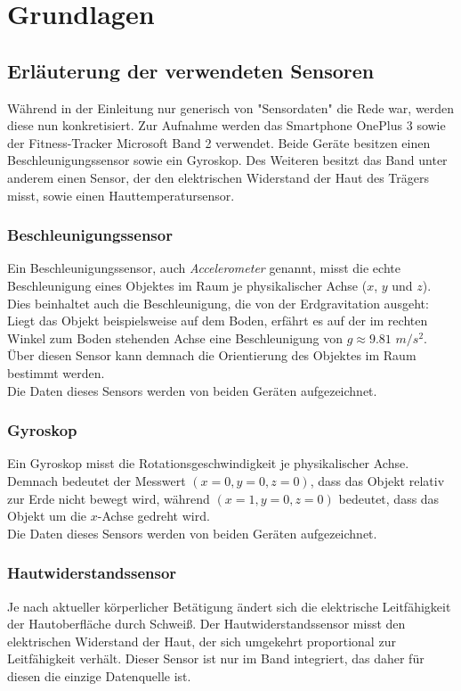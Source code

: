 \chapter{Grundlagen}
\label{chap:background}
\section{Erläuterung der verwendeten Sensoren}
Während in der Einleitung nur generisch von "Sensordaten" die Rede war, werden diese nun konkretisiert. Zur Aufnahme werden das Smartphone OnePlus 3 sowie der Fitness-Tracker Microsoft Band 2 verwendet. Beide Geräte besitzen einen Beschleunigungssensor sowie ein Gyroskop. Des Weiteren besitzt das Band unter anderem einen Sensor, der den elektrischen Widerstand der Haut des Trägers misst, sowie einen Hauttemperatursensor.

\subsection{Beschleunigungssensor}
Ein Beschleunigungssensor, auch \textit{Accelerometer} genannt, misst die echte Beschleunigung eines Objektes im Raum je physikalischer Achse ($x$, $y$ und $z$). Dies beinhaltet auch die Beschleunigung, die von der Erdgravitation ausgeht: Liegt das Objekt beispielsweise auf dem Boden, erfährt es auf der im rechten Winkel zum Boden stehenden Achse eine Beschleunigung von $g \approx 9.81$ $m/s^2$\cite{SensorsOverview}\cite{nistsi}. Über diesen Sensor kann demnach die Orientierung des Objektes im Raum bestimmt werden. \\
Die Daten dieses Sensors werden von beiden Geräten aufgezeichnet.

\subsection{Gyroskop}
Ein Gyroskop misst die Rotationsgeschwindigkeit je physikalischer Achse\cite{SensorsOverview}. Demnach bedeutet der Messwert $(x=0, y=0, z=0)$, dass das Objekt relativ zur Erde nicht bewegt wird, während $(x=1, y=0, z=0)$ bedeutet, dass das Objekt um die $x$-Achse gedreht wird. \\
Die Daten dieses Sensors werden von beiden Geräten aufgezeichnet.

\subsection{Hautwiderstandssensor}
Je nach aktueller körperlicher Betätigung ändert sich die elektrische Leitfähigkeit der Hautoberfläche durch Schweiß. Der Hautwiderstandssensor misst den elektrischen Widerstand der Haut, der sich umgekehrt proportional zur Leitfähigkeit verhält.
Dieser Sensor ist nur im Band integriert, das daher für diesen die einzige Datenquelle ist.


